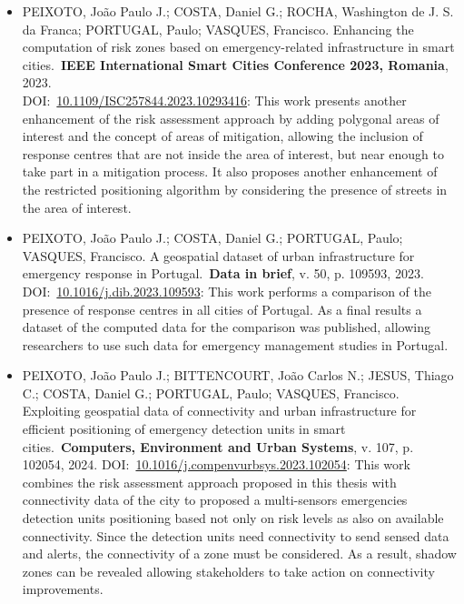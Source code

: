 \begin{refsection}
\begin{itemize}
  \item \uppercase{Peixoto}, João Paulo J.; \uppercase{Costa}, Daniel G.; \uppercase{Rocha}, Washington de J. S. da Franca; \uppercase{Portugal}, Paulo; \uppercase{Vasques}, Francisco. Enhancing the computation of risk zones based on emergency-related infrastructure in smart cities.\ \textbf{IEEE International Smart Cities Conference 2023, Romania}, 2023.\\DOI:\ \hyperref{https://doi.org/10.1109/ISC257844.2023.10293416}{}{}{10.1109/ISC257844.2023.10293416}: This work presents another enhancement of the risk assessment approach by adding polygonal areas of interest and the concept of areas of mitigation, allowing the inclusion of response centres that are not inside the area of interest, but near enough to take part in a mitigation process. It also proposes another enhancement of the restricted positioning algorithm by considering the presence of streets in the area of interest.

  \item \uppercase{Peixoto}, João Paulo J.; \uppercase{Costa}, Daniel G.; \uppercase{Portugal}, Paulo; \uppercase{Vasques}, Francisco. A geospatial dataset of urban infrastructure for emergency response in Portugal.\ \textbf{Data in brief}, v. 50, p. 109593, 2023. DOI:\ \hyperref{https://doi.org/10.1016/j.dib.2023.109593}{}{}{10.1016/j.dib.2023.109593}: This work performs a comparison of the presence of response centres in all cities of Portugal. As a final results a dataset of the computed data for the comparison was published, allowing researchers to use such data for emergency management studies in Portugal.

  \item \uppercase{Peixoto}, João Paulo J.; \uppercase{Bittencourt}, João Carlos N.; \uppercase{Jesus}, Thiago C.; \uppercase{Costa}, Daniel G.; \uppercase{Portugal}, Paulo; \uppercase{Vasques}, Francisco. Exploiting geospatial data of connectivity and urban infrastructure for efficient positioning of emergency detection units in smart cities.\ \textbf{Computers, Environment and Urban Systems}, v. 107, p. 102054, 2024. DOI:\ \hyperref{https://doi.org/10.1016/j.compenvurbsys.2023.102054}{}{}{10.1016/j.compenvurbsys.2023.102054}: This work combines the risk assessment approach proposed in this thesis with connectivity data of the city to proposed a multi-sensors emergencies detection units positioning based not only on risk levels as also on available connectivity. Since the detection units need connectivity to send sensed data and alerts, the connectivity of a zone must be considered. As a result, shadow zones can be revealed allowing stakeholders to take action on connectivity improvements.


\end{itemize}
\end{refsection}
